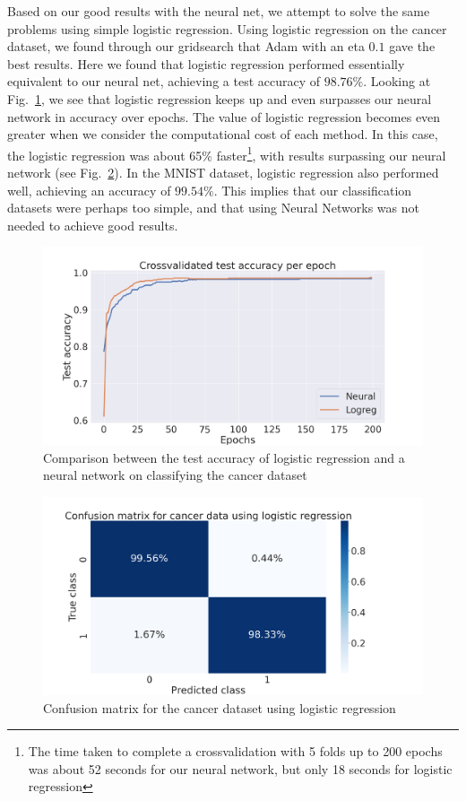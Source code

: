 \documentclass[onecolumn,10pt,cleanfoot]{asme2ej}
\begin{document}
Based on our good results with the neural net, we attempt to solve the same problems using simple logistic regression. Using logistic regression on the cancer dataset, we found through our gridsearch that Adam with an eta $0.1$ gave the best results. Here we found that logistic regression performed essentially equivalent to our neural net, achieving a test accuracy of $98.76\%$. Looking at Fig.~\ref{cancerlogneur}, we see that logistic regression keeps up and even surpasses our neural network in accuracy over epochs. The value of logistic regression becomes even greater when we consider the computational cost of each method. In this case, the logistic regression was about 65\% faster\footnote{The time taken to complete a crossvalidation with 5 folds up to 200 epochs was about 52 seconds for our neural network, but only 18 seconds for logistic regression}, with results surpassing our neural network (see Fig.~\ref{cancerconflog}). In the MNIST dataset, logistic regression also performed well, achieving an accuracy of $99.54\%$. This implies that our classification datasets were perhaps too simple, and that using Neural Networks was not needed to achieve good results. 
	
\begin{figure}[H]
\centerline{\includegraphics[width=5in]{figure/comp_NN_logreg_cancer.png}}
\caption{Comparison between the test accuracy of logistic regression and a neural network on classifying the cancer dataset}
\label{cancerlogneur}
\end{figure}
\begin{figure}[H]
\centerline{\includegraphics[width=5in]{figure/conf_mat_logreg_cancer.png}}
\caption{Confusion matrix for the cancer dataset using logistic regression}
\label{cancerconflog}
\end{figure}
\end{document}
